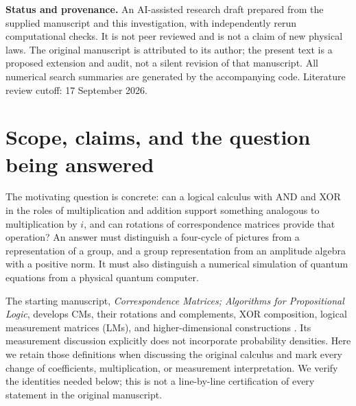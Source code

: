 \begin{titlepage}
\begin{minipage}{0.91\textwidth}
\begin{abstract}
An integral lift and the quotient identifying opposite phase directions produce $\Z[i]$, with the explicit intertwiner $QP=JQ$ connecting CM rotation to the real quarter-turn matrix. The resulting phase-count representation reproduces conventional quantum gates and extends to exact Clifford+$T$ arithmetic. A separate, faithful compilation maps original CM predicates to reversible oracles and diagonal phase gates. Proofs and new computations distinguish this semantic bridge from a claim that ordinary CM truth-table operations already constitute quantum mechanics. Related matrix logics, finite-field models, path-sum calculi, cyclotomic synthesis, and model-counting methods substantially precede the general ideas. Plausible contributions lie in typed CM-based explanation, certified local rewrites, and structure-aware compilation; neither physical novelty nor a new simulation speedup is established.
\end{abstract}
\end{minipage}
\vfill
\begin{minipage}{0.91\textwidth}\small
\textbf{Status and provenance.} An AI-assisted research draft prepared from the supplied manuscript and this investigation, with independently rerun computational checks. It is not peer reviewed and is not a claim of new physical laws. The original manuscript is attributed to its author; the present text is a proposed extension and audit, not a silent revision of that manuscript. All numerical search summaries are generated by the accompanying code. Literature review cutoff: 17 September 2026.
\end{minipage}
\end{titlepage}
\tableofcontents
\clearpage
\section{Scope, claims, and the question being answered}\label{sec:scope}
The motivating question is concrete: can a logical calculus with AND and XOR in the roles of multiplication and addition support something analogous to multiplication by $i$, and can rotations of correspondence matrices provide that operation? An answer must distinguish a four-cycle of pictures from a representation of a group, and a group representation from an amplitude algebra with a positive norm. It must also distinguish a numerical simulation of quantum equations from a physical quantum computer.

The starting manuscript, \emph{Correspondence Matrices; Algorithms for Propositional Logic}, develops CMs, their rotations and complements, XOR composition, logical measurement matrices (LMs), and higher-dimensional constructions \cite{droncheff}. Its measurement discussion explicitly does not incorporate probability densities. Here we retain those definitions when discussing the original calculus and mark every change of coefficients, multiplication, or measurement interpretation. We verify the identities needed below; this is not a line-by-line certification of every statement in the original manuscript.

